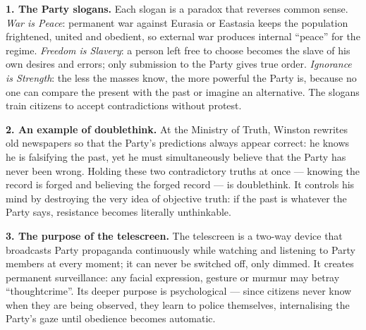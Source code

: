 \documentclass[11pt]{article}
\begin{document}
\begin{corrige}
\textbf{1. The Party slogans.} Each slogan is a paradox that reverses common sense. \emph{War is Peace}: permanent war against Eurasia or Eastasia keeps the population frightened, united and obedient, so external war produces internal ``peace'' for the regime. \emph{Freedom is Slavery}: a person left free to choose becomes the slave of his own desires and errors; only submission to the Party gives true order. \emph{Ignorance is Strength}: the less the masses know, the more powerful the Party is, because no one can compare the present with the past or imagine an alternative. The slogans train citizens to accept contradictions without protest.

\textbf{2. An example of doublethink.} At the Ministry of Truth, Winston rewrites old newspapers so that the Party's predictions always appear correct: he knows he is falsifying the past, yet he must simultaneously believe that the Party has never been wrong. Holding these two contradictory truths at once — knowing the record is forged and believing the forged record — is doublethink. It controls his mind by destroying the very idea of objective truth: if the past is whatever the Party says, resistance becomes literally unthinkable.

\textbf{3. The purpose of the telescreen.} The telescreen is a two-way device that broadcasts Party propaganda continuously while watching and listening to Party members at every moment; it can never be switched off, only dimmed. It creates permanent surveillance: any facial expression, gesture or murmur may betray ``thoughtcrime''. Its deeper purpose is psychological — since citizens never know when they are being observed, they learn to police themselves, internalising the Party's gaze until obedience becomes automatic.
\end{corrige}
\end{document}
